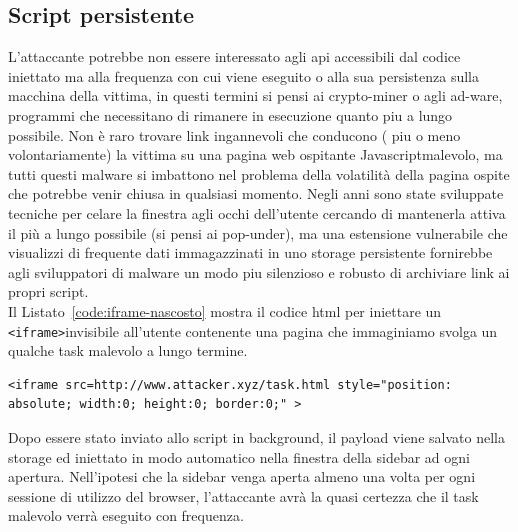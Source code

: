 \documentclass{sapthesis}
\newcommand{\code}[1]{\texttt{#1}}
\newcommand{\refCode}[1]{Listato~\ref{#1}}
\newcommand{\JS}{Javascript}
\newcommand{\tagHTML}[1]{\code{<#1>}}
\newcommand{\iframe}{\tagHTML{iframe}}
\begin{document}
        \subsection{Script persistente}
            L'attaccante potrebbe non essere interessato agli api accessibili dal codice iniettato ma
            alla frequenza con cui viene eseguito o alla sua persistenza sulla macchina della vittima, 
            in questi termini si pensi ai crypto-miner o agli ad-ware, programmi che necessitano di 
            rimanere in esecuzione quanto piu a lungo possibile.
            Non è raro trovare link ingannevoli che conducono ( piu o meno
            volontariamente) la vittima su una pagina web ospitante \JS malevolo, ma tutti questi malware
            si imbattono nel problema della volatilità della pagina ospite che potrebbe venir chiusa in
            qualsiasi momento. Negli anni sono state sviluppate tecniche per celare la finestra agli occhi
            dell'utente cercando di mantenerla attiva il più a lungo possibile (si pensi ai pop-under), ma
            una estensione vulnerabile che visualizzi di frequente dati immagazzinati in uno storage 
            persistente fornirebbe agli sviluppatori di malware un modo piu silenzioso e robusto di
            archiviare link ai propri script.\\
            Il \refCode{code:iframe-nascosto} mostra il codice html per iniettare un \iframe invisibile
            all'utente contenente una pagina che immaginiamo svolga un qualche task malevolo a lungo termine.

            \begin{lstlisting}[label=code:iframe-nascosto]
    <iframe src=http://www.attacker.xyz/task.html style="position: absolute; width:0; height:0; border:0;" >
            \end{lstlisting}

            Dopo essere stato inviato allo script in background, il payload viene salvato nella storage ed
            iniettato in modo automatico nella finestra della sidebar ad ogni apertura. Nell'ipotesi che
            la sidebar venga aperta almeno una volta per ogni sessione di utilizzo del browser, l'attaccante
            avrà la quasi certezza che il task malevolo verrà eseguito con frequenza.
\end{document}
